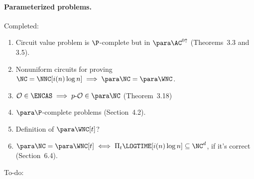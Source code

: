 \documentclass[draft]{article}
\newcommand{\dash}{\textnormal{-}}
\begin{document}
\paragraph{Parameterized problems.}
Completed:
\begin{enumerate}
\item Circuit value problem is $\P$-complete but in $\para \AC^{0 \uparrow}$ (Theorems~3.3 and 3.5).
\item Nonuniform circuits for proving $\NC = \NNC[i(n) \log n] \implies \para \NC = \para \WNC$.
\item $\mathcal{O} \in \ENCAS \implies p \dash \mathcal{O} \in \para \NC$ (Theorem~3.18)
\item $\para \P$-complete problems (Section~4.2).
\item Definition of $\para \WNC[t]$?
\item $\para\NC = \para \WNC[t] \iff \Pi_t\LOGTIME[i(n) \log n] \subseteq \NC^d$, if it's correct (Section~6.4).
\end{enumerate}
To-do:
\end{document}
